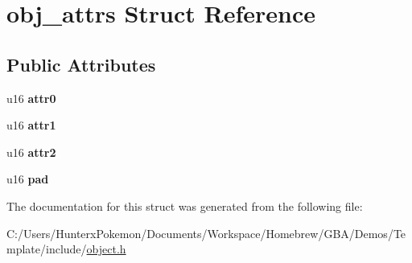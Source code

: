 \hypertarget{structobj__attrs}{}\section{obj\+\_\+attrs Struct Reference}
\label{structobj__attrs}
\subsection*{Public Attributes}
\begin{DoxyCompactItemize}
\item 
\mbox{\label{structobj__attrs_ab48dd3410b7c8de315d065774d9ea79e}} 
u16 {\bfseries attr0}
\item 
\mbox{\label{structobj__attrs_ac7cbd0dacb93157218cddd96185cfbf7}} 
u16 {\bfseries attr1}
\item 
\mbox{\label{structobj__attrs_a0c305199242dddd53ba56e45a8756405}} 
u16 {\bfseries attr2}
\item 
\mbox{\label{structobj__attrs_acd9f84b88c7c8e7ac7e39eb06565e21d}} 
u16 {\bfseries pad}
\end{DoxyCompactItemize}


The documentation for this struct was generated from the following file\+:\begin{DoxyCompactItemize}
\item 
C\+:/\+Users/\+Hunterx\+Pokemon/\+Documents/\+Workspace/\+Homebrew/\+G\+B\+A/\+Demos/\+Template/include/\hyperlink{object_8h}{object.\+h}\end{DoxyCompactItemize}
